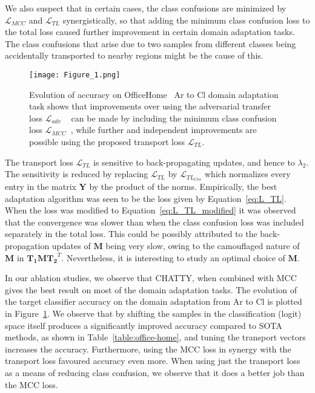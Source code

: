 \documentclass[10pt,twocolumn,letterpaper]{article}
\begin{document}
We also suspect that in certain cases, the class confusions are minimized by $\mathcal{L}_{MCC}$ and $\mathcal{L}_{TL}$ synergistically, so that adding the minimum class confusion loss to the total loss caused further improvement in certain domain adaptation tasks. The class confusions that arise due to two samples from different classes being accidentally transported to nearby regions might be the cause of this. 

\begin{figure}
\begin{center}
   \texttt{[image: Figure\_1.png]}
\end{center}
   \caption{Evolution of accuracy on OfficeHome~\cite{office-home} Ar to Cl domain adaptation task shows that improvements over using the adversarial transfer loss $\mathcal{L}_{adv}$ ~\cite{dann,cdan} can be made by including the minimum class confusion loss $\mathcal{L}_{MCC}$~\cite{mcc}, while further and independent improvements are possible using the proposed transport loss $\mathcal{L}_{TL}$.}
\label{fig:short}
\end{figure}

The transport loss $\mathcal{L}_{TL}$ is sensitive to back-propagating updates, and hence to $\lambda_2$. The sensitivity is reduced by replacing $\mathcal{L}_{TL}$ by $\mathcal{L}_{TL_{Cos}}$ which normalizes every entry in the matrix $\mathbf{Y}$ by the product of the norms. Empirically, the best adaptation algorithm was seen to be the loss given by Equation~\ref{eq:L_TL}. When the loss was modified to Equation~\ref{eq:L_TL_modified} it was observed that the convergence was slower than when the class confusion loss was included separately in the total loss. This could be possibly attributed to the back-propagation updates of $\mathbf{M}$ being very slow, owing to the camouflaged nature of $\mathbf{M}$ in $\mathbf{T_1} \mathbf{M} \mathbf{T_2}^T$. Nevertheless, it is interesting to study an optimal choice of $\mathbf{M}$.

In our ablation studies, we observe that CHATTY, when combined with MCC~\cite{mcc} gives the best result on most of the domain adaptation tasks. The evolution of the target classifier accuracy on the domain adaptation from Ar to Cl is plotted in Figure~\ref{fig:short}. We observe that by shifting the samples in the classification (logit) space itself produces a significantly improved accuracy compared to SOTA methods, as shown in Table~\ref{table:office-home}, and tuning the transport vectors increases the accuracy. Furthermore, using the MCC loss in synergy with the transport loss favoured accuracy even more. When using just the transport loss as a means of reducing class confusion, we observe that it does a better job than the MCC loss.
\end{document}
